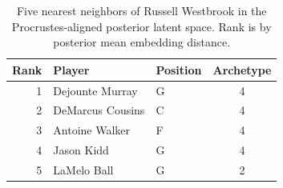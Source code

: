 \begin{table}[htbp]
  \centering\small
  \begin{tabular}{rllc}
    \toprule
    Rank & Player & Position & Archetype \\
    \midrule
    1 & Dejounte Murray & G & 4 \\
    2 & DeMarcus Cousins & C & 4 \\
    3 & Antoine Walker & F & 4 \\
    4 & Jason Kidd & G & 4 \\
    5 & LaMelo Ball & G & 2 \\
    \bottomrule
  \end{tabular}
  \caption{Five nearest neighbors of Russell Westbrook in the Procrustes-aligned posterior latent space. Rank is by posterior mean embedding distance.}
  \label{tab:Russell_Westbrook_neighbors}
\end{table}

